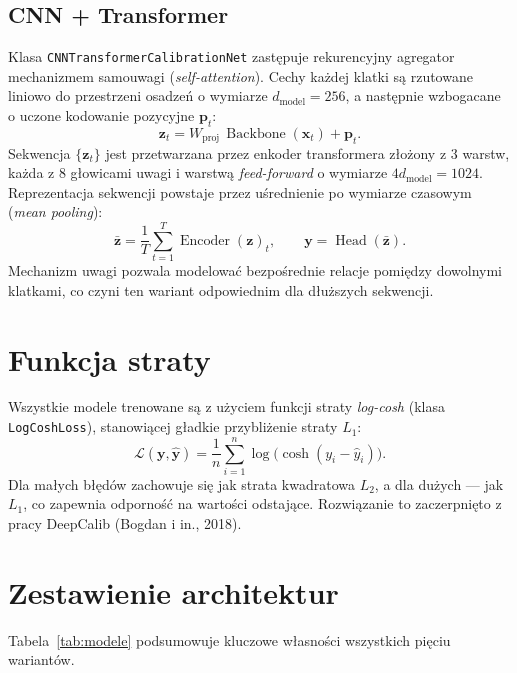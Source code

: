 \documentclass[12pt,a4paper]{report}
\begin{document}
\subsection{CNN + Transformer}
Klasa \texttt{CNNTransformerCalibrationNet} zastępuje rekurencyjny agregator mechanizmem
samouwagi (\emph{self-attention}). Cechy każdej klatki są rzutowane liniowo do przestrzeni
osadzeń o wymiarze $d_{\text{model}} = 256$, a następnie wzbogacane o uczone kodowanie
pozycyjne $\mathbf{p}_t$:
\begin{equation}
  \mathbf{z}_t = W_{\text{proj}}\,\operatorname{Backbone}(\mathbf{x}_t) + \mathbf{p}_t .
\end{equation}
Sekwencja $\{\mathbf{z}_t\}$ jest przetwarzana przez enkoder transformera złożony z
$3$ warstw, każda z $8$ głowicami uwagi i warstwą \emph{feed-forward} o wymiarze
$4 d_{\text{model}} = 1024$. Reprezentacja sekwencji powstaje przez uśrednienie po
wymiarze czasowym (\emph{mean pooling}):
\begin{equation}
  \bar{\mathbf{z}} = \frac{1}{T} \sum_{t=1}^{T} \operatorname{Encoder}(\mathbf{z})_t,
  \qquad \mathbf{y} = \operatorname{Head}(\bar{\mathbf{z}}).
\end{equation}
Mechanizm uwagi pozwala modelować bezpośrednie relacje pomiędzy dowolnymi klatkami, co
czyni ten wariant odpowiednim dla dłuższych sekwencji.

\section{Funkcja straty}
Wszystkie modele trenowane są z użyciem funkcji straty \emph{log-cosh}
(klasa \texttt{LogCoshLoss}), stanowiącej gładkie przybliżenie straty $L_1$:
\begin{equation}
  \mathcal{L}(\mathbf{y}, \hat{\mathbf{y}}) =
  \frac{1}{n} \sum_{i=1}^{n} \log\!\big(\cosh(y_i - \hat{y}_i)\big).
\end{equation}
Dla małych błędów zachowuje się jak strata kwadratowa $L_2$, a dla dużych --- jak
$L_1$, co zapewnia odporność na wartości odstające. Rozwiązanie to zaczerpnięto z pracy
DeepCalib (Bogdan i in., 2018).

\section{Zestawienie architektur}
Tabela~\ref{tab:modele} podsumowuje kluczowe własności wszystkich pięciu wariantów.
\end{document}
